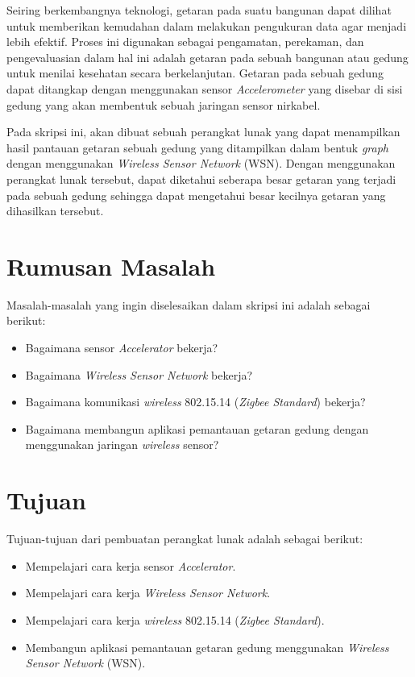 \documentclass[a4paper,twoside]{article}
\begin{document}
Seiring berkembangnya teknologi, getaran pada suatu bangunan dapat dilihat untuk memberikan kemudahan dalam melakukan pengukuran data agar menjadi lebih efektif. Proses ini digunakan sebagai pengamatan, perekaman, dan pengevaluasian dalam hal ini adalah getaran pada sebuah bangunan atau gedung untuk menilai kesehatan secara berkelanjutan. Getaran pada sebuah gedung dapat ditangkap dengan menggunakan sensor \textit{Accelerometer} yang disebar di sisi gedung yang akan membentuk sebuah jaringan sensor nirkabel.

Pada skripsi ini, akan dibuat sebuah perangkat lunak yang dapat menampilkan hasil pantauan getaran sebuah gedung yang ditampilkan dalam bentuk \textit{graph} dengan menggunakan \textit{Wireless Sensor Network} (WSN). Dengan menggunakan perangkat lunak tersebut, dapat diketahui seberapa besar getaran yang terjadi pada sebuah gedung sehingga dapat mengetahui besar kecilnya getaran yang dihasilkan tersebut.

\section{Rumusan Masalah}
Masalah-masalah yang ingin diselesaikan dalam skripsi ini adalah sebagai berikut:
\begin{itemize}
	\item Bagaimana sensor \textit{Accelerator} bekerja?
	\item Bagaimana \textit{Wireless Sensor Network} bekerja?
	\item Bagaimana komunikasi \textit{wireless} 802.15.14 (\textit{Zigbee Standard}) bekerja? 
	\item Bagaimana membangun aplikasi pemantauan getaran gedung dengan menggunakan jaringan \textit{wireless} sensor?
\end{itemize}

\section{Tujuan}
Tujuan-tujuan dari pembuatan perangkat lunak adalah sebagai berikut:
\begin{itemize}
	\item Mempelajari cara kerja sensor \textit{Accelerator}.
	\item Mempelajari cara kerja \textit{Wireless Sensor Network}.
	\item Mempelajari cara kerja \textit{wireless} 802.15.14 (\textit{Zigbee Standard}).
	\item Membangun aplikasi pemantauan getaran gedung menggunakan \textit{Wireless Sensor Network } (WSN).
\end{itemize}
\end{document}
